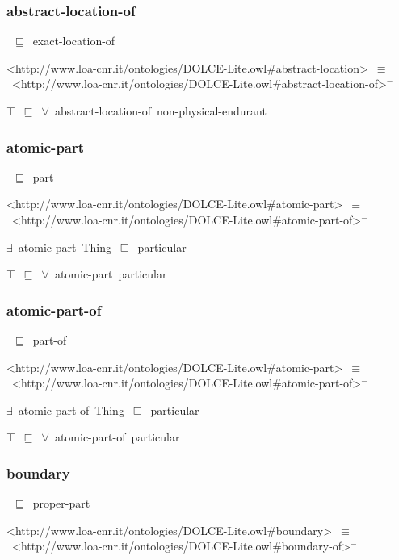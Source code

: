\documentclass{article}
\begin{document}
\subsubsection*{abstract-location-of}

~\ensuremath{\sqsubseteq}~exact-location-of

<http://www.loa-cnr.it/ontologies/DOLCE-Lite.owl#abstract-location>~\ensuremath{\equiv}~<http://www.loa-cnr.it/ontologies/DOLCE-Lite.owl#abstract-location-of>\ensuremath{^-}

\ensuremath{\top}~\ensuremath{\sqsubseteq}~\ensuremath{\forall}~abstract-location-of~non-physical-endurant

\subsubsection*{atomic-part}

~\ensuremath{\sqsubseteq}~part

<http://www.loa-cnr.it/ontologies/DOLCE-Lite.owl#atomic-part>~\ensuremath{\equiv}~<http://www.loa-cnr.it/ontologies/DOLCE-Lite.owl#atomic-part-of>\ensuremath{^-}

\ensuremath{\exists}~atomic-part~Thing~\ensuremath{\sqsubseteq}~particular

\ensuremath{\top}~\ensuremath{\sqsubseteq}~\ensuremath{\forall}~atomic-part~particular

\subsubsection*{atomic-part-of}

~\ensuremath{\sqsubseteq}~part-of

<http://www.loa-cnr.it/ontologies/DOLCE-Lite.owl#atomic-part>~\ensuremath{\equiv}~<http://www.loa-cnr.it/ontologies/DOLCE-Lite.owl#atomic-part-of>\ensuremath{^-}

\ensuremath{\exists}~atomic-part-of~Thing~\ensuremath{\sqsubseteq}~particular

\ensuremath{\top}~\ensuremath{\sqsubseteq}~\ensuremath{\forall}~atomic-part-of~particular

\subsubsection*{boundary}

~\ensuremath{\sqsubseteq}~proper-part

<http://www.loa-cnr.it/ontologies/DOLCE-Lite.owl#boundary>~\ensuremath{\equiv}~<http://www.loa-cnr.it/ontologies/DOLCE-Lite.owl#boundary-of>\ensuremath{^-}
\end{document}
